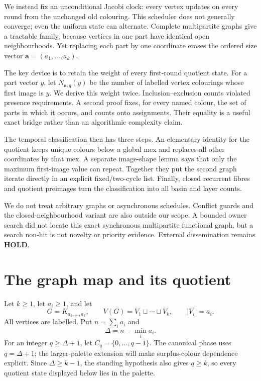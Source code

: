 \documentclass[11pt,a4paper]{amsart}
\theoremstyle{definition}
\theoremstyle{remark}
\newcommand{\Cq}{C_q}
\begin{document}
We instead fix an unconditional Jacobi clock: every vertex updates on every
round from the unchanged old colouring.  This scheduler does not generally
converge; even the uniform state can alternate.  Complete multipartite graphs
give a tractable family, because vertices in one part have identical open
neighbourhoods.  Yet replacing each part by one coordinate erases the
ordered size vector \(\mathbf a=(a_1,\ldots,a_k)\).

The key device is to retain the weight of every first-round quotient state.
For a part vector \(y\), let \(N_{\mathbf a,q}(y)\) be the number of labelled
vertex colourings whose first image is \(y\).  We derive this weight twice.
Inclusion--exclusion counts violated presence requirements.  A second proof
fixes, for every named colour, the set of parts in which it occurs, and
counts onto assignments.  Their equality is a useful exact bridge rather
than an algorithmic complexity claim.

The temporal classification then has three steps.  An elementary identity
for the quotient keeps unique colours below a global mex and replaces all
other coordinates by that mex.  A separate image-shape lemma says that only
the maximum first-image value can repeat.  Together they put the second
graph iterate directly in an explicit fixed/two-cycle list.  Finally,
closed recurrent fibres and quotient preimages turn the classification into
all basin and layer counts.

We do not treat arbitrary graphs or asynchronous schedules.  Conflict
guards and the closed-neighbourhood variant are also outside our scope.  A
bounded owner search did not locate this exact synchronous multipartite
functional graph, but a search non-hit is not novelty or priority evidence.
External dissemination remains \textbf{HOLD}.

\section{The graph map and its quotient}

Let \(k\ge1\), let \(a_i\ge1\), and let
\[
 G=K_{a_1,\ldots,a_k},\qquad
 V(G)=V_1\sqcup\cdots\sqcup V_k,\qquad |V_i|=a_i.
\]
All vertices are labelled.  Put \(n=\sum_i a_i\) and
\[
                  \Delta=n-\min_i a_i.
\]
For an integer \(q\ge\Delta+1\), let
\(\Cq=\{0,\ldots,q-1\}\).  The canonical phase uses \(q=\Delta+1\);
the larger-palette extension will make surplus-colour dependence explicit.
Since \(\Delta\ge k-1\), the standing hypothesis also gives \(q\ge k\), so
every quotient state displayed below lies in the palette.
\end{document}
